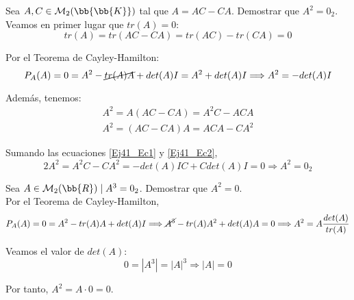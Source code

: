 \begin{ejercicio}
    Sea $A,C \in \mathcal{M}_2(\bb{\bb{K}})$ tal que $A=AC-CA$. Demostrar que $A^2=0_2$.\\

    Veamos en primer lugar que $tr(A)=0$:
    $$tr(A) = tr(AC-CA) = tr(AC) - tr(CA) = 0$$
    
    Por el Teorema de Cayley-Hamilton:
    $$P_A(A) = 0 = A^2 -\cancel{tr(A)A} + det(A)I = A^2 + det(A)I \Longrightarrow A^2 = -det(A)I$$

    Además, tenemos:
    \begin{gather}
        \label{Ej41_Ec1} A^2 = A(AC-CA) = A^2C - ACA \\
        \label{Ej41_Ec2} A^2 = (AC-CA)A = ACA - CA^2
    \end{gather}

    Sumando las ecuaciones \ref{Ej41_Ec1} y \ref{Ej41_Ec2},
    $$2A^2 = A^2C- CA^2 = -det(A)IC +Cdet(A)I = 0 \Longrightarrow A^2 = 0_2$$
\end{ejercicio}

\begin{ejercicio}
    Sea $A\in \mathcal{M}_2(\bb{R}) \mid A^3=0_2$. Demostrar que $A^2=0$.\\

    Por el Teorema de Cayley-Hamilton,
    \begin{equation*}
        P_A(A) = 0 = A^2 - tr(A)A + det(A)I \Longrightarrow \cancel{A^3} - tr(A)A^2 + det(A)A = 0 \Longrightarrow A^2 = A\frac{det(A)}{tr(A)}
    \end{equation*}

    Veamos el valor de $det(A):$
    \begin{equation*}
        0 = |A^3| = |A|^3 \Longrightarrow |A|=0
    \end{equation*}

    Por tanto, $A^2 = A\cdot 0 = 0$.
\end{ejercicio}



